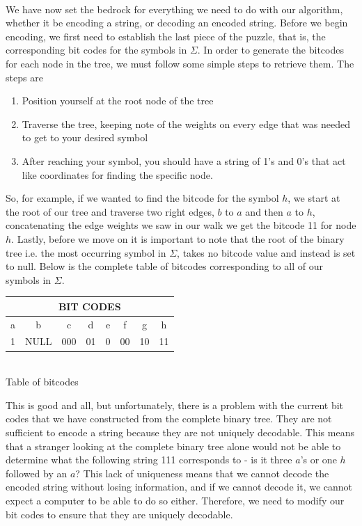 \documentclass[12pt]{IEEEtran}
\begin{document}
\\
We have now set the bedrock for everything we need to do with our algorithm, whether it be encoding a string, or decoding 
an encoded string. Before we begin encoding, we first need to establish the last piece of the puzzle, that is, the corresponding 
bit codes for the symbols in $\Sigma$. In order to generate the bitcodes for each node in the tree, we must follow some simple steps
to retrieve them. The steps are
\begin{enumerate}
	\item Position yourself at the root node of the tree
	\item Traverse the tree, keeping note of the weights on every edge that was needed to get to your desired symbol
	\item After reaching your symbol, you should have a string of 1's and 0's that act like coordinates for finding the specific node.
\end{enumerate}
So, for example, if we wanted to find the bitcode for the symbol $h$, we start at the root of our tree and traverse
two right edges, $b$ to $a$ and then $a$ to $h$, concatenating the edge weights we saw in our walk we get the bitcode 11 for node $h$. Lastly, before we move on
it is important to note that the root of the binary tree i.e. the most occurring symbol in $\Sigma$, takes no bitcode value and instead is set to null.
Below is the complete table of bitcodes corresponding to all of our symbols in $\Sigma$.\\
\begin{center}
	\begin{tabular}{|c|c|c|c|c|c|c|c|}
		\hline
		\multicolumn{8}{|c|}{BIT CODES} \\
		\hline
		a & b & c & d & e & f & g & h \\
		\hline
		1  & NULL  & 000  & 01  & 0  & 00  & 10  & 11\\
		\hline
	\end{tabular}\\
	\vspace{0.1in}
	Table of bitcodes
\end{center}
This is good and all, but unfortunately, 
there is a problem with the current bit codes that we have constructed from the complete binary tree. They are not sufficient to encode a string because they are not 
uniquely decodable. This means that a stranger looking at the complete binary tree alone would not be able to determine what the following string 111 corresponds to - 
is it three $a$'s or one $h$ followed by an $a$? This lack of uniqueness means that we cannot decode the encoded string without losing information, and if we cannot decode it,
we cannot expect a computer to be able to do so either. Therefore, we need to modify our bit codes to ensure that they are uniquely decodable. \\
\end{document}
